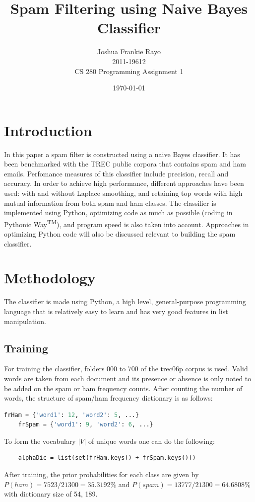 \documentclass{article}
\title{Spam Filtering using Naive Bayes Classifier}
\author{Joshua Frankie Rayo\\2011-19612\\CS 280 Programming Assignment 1}
\date{\today}
\begin{document}
\maketitle
\tableofcontents

\section{Introduction}
	In this paper a spam filter is constructed using a naive Bayes classifier. It has been benchmarked with the TREC public corpora that contains spam and ham emails. Perfomance measures of this classifier include precision, recall and accuracy. In order to achieve high performance, different approaches have been used: with and without Laplace smoothing, and retaining top words with high mutual information from both spam and ham classes. The classifier is implemented using Python, optimizing code as much as possible (coding in Pythonic Way\textsuperscript{TM}), and program speed is also taken into account. Approaches in optimizing Python code will also be discussed relevant to building the spam classifier.
\section{Methodology}
The classifier is made using Python, a high level, general-purpose programming language that is relatively easy to learn and has very good features in list manipulation.
\subsection{Training}
For training the classifier, folders 000 to 700 of the trec06p corpus is used. Valid words are taken from each document and its presence or absence is only noted to be added on the spam or ham frequency counts. After counting the number of words, the structure of spam/ham frequency dictionary is as follows:
\begin{lstlisting}[language=Python]
	frHam = {'word1': 12, 'word2': 5, ...}
	frSpam = {'word1': 9, 'word2': 6, ...}
\end{lstlisting}

To form the vocabulary $|V|$ of unique words one can do the following:
\begin{lstlisting}
	alphaDic = list(set(frHam.keys() + frSpam.keys()))
\end{lstlisting}

After training, the prior probabilities for each class are given by $P(ham) = 7523/21300 = 35.3192\%$ and $P(spam) = 13777/21300 = 64.6808\%$ with dictionary size of 54, 189.
\end{document}
